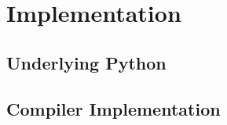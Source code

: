 \chapter{Implementation}\label{ch:ch2label}

\section{Underlying Python}\label{sec:underlying-python}


\section{Compiler Implementation}\label{sec:compiler-implementation}


%
%